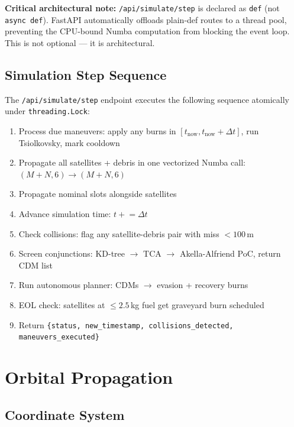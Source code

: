 \documentclass[12pt,a4paper]{article}
\begin{document}
\textbf{Critical architectural note:} \texttt{/api/simulate/step} is declared as \texttt{def} (not \texttt{async def}). FastAPI automatically offloads plain-def routes to a thread pool, preventing the CPU-bound Numba computation from blocking the event loop. This is not optional --- it is architectural.

\subsection{Simulation Step Sequence}

The \texttt{/api/simulate/step} endpoint executes the following sequence atomically under \texttt{threading.Lock}:

\begin{enumerate}[noitemsep]
  \item Process due maneuvers: apply any burns in $[t_{\text{now}}, t_{\text{now}} + \Delta t]$, run Tsiolkovsky, mark cooldown
  \item Propagate all satellites + debris in one vectorized Numba call: $(M+N, 6) \rightarrow (M+N, 6)$
  \item Propagate nominal slots alongside satellites
  \item Advance simulation time: $t \mathrel{+}= \Delta t$
  \item Check collisions: flag any satellite-debris pair with miss $< 100$\,m
  \item Screen conjunctions: KD-tree $\rightarrow$ TCA $\rightarrow$ Akella-Alfriend PoC, return CDM list
  \item Run autonomous planner: CDMs $\rightarrow$ evasion + recovery burns
  \item EOL check: satellites at $\leq 2.5$\,kg fuel get graveyard burn scheduled
  \item Return \texttt{\{status, new\_timestamp, collisions\_detected, maneuvers\_executed\}}
\end{enumerate}

\section{Orbital Propagation}

\subsection{Coordinate System}
\end{document}
